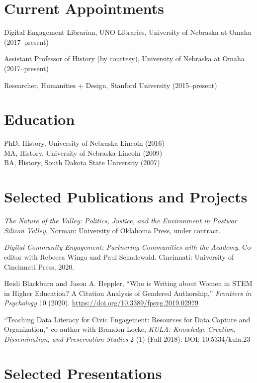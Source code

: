 \section{Current Appointments}\label{current-appointments}

Digital Engagement Librarian, UNO Libraries, University of Nebraska at
Omaha (2017--present)

Assistant Professor of History (by courtesy), University of Nebraska at
Omaha (2017--present)

Researcher, Humanities + Design, Stanford University (2015--present)

\section{Education}\label{education}

PhD, History, University of Nebraska-Lincoln (2016)\\
MA, History, University of Nebraska-Lincoln (2009)\\
BA, History, South Dakota State University (2007)

\section{Selected Publications and
Projects}\label{selected-publications-and-projects}

\emph{The Nature of the Valley: Politics, Justice, and the Environment
in Postwar Silicon Valley}. Norman: University of Oklahoma Press, under
contract.

\emph{Digital Community Engagement: Partnering Communities with the
Academy}. Co-editor with Rebecca Wingo and Paul Schadewald. Cincinnati:
University of Cincinnati Press, 2020.

Heidi Blackburn and Jason A. Heppler, ``Who is Writing about Women in
STEM in Higher Education? A Citation Analysis of Gendered Authorship,''
\emph{Frontiers in Psychology} 10 (2020).
\url{https://doi.org/10.3389/fpsyg.2019.02979}

``Teaching Data Literacy for Civic Engagement: Resources for Data
Capture and Organization,'' co-author with Brandon Locke, \emph{KULA:
Knowledge Creation, Dissemination, and Preservation Studies} 2 (1) (Fall
2018). DOI: 10.5334/kula.23

\section{Selected Presentations}\label{selected-presentations}

